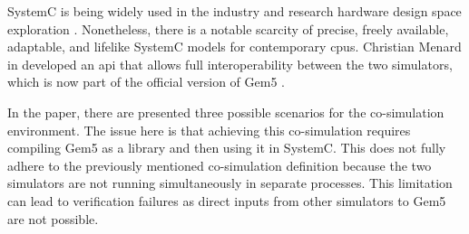 SystemC is being widely used in the industry and research hardware design space exploration \cite{menard2017system}. Nonetheless, there 
is a notable scarcity of precise, freely available, adaptable, and lifelike SystemC models for contemporary \glspl{cpu}. Christian Menard 
in \cite{menard2017system} developed an \gls{api} that allows full interoperability between the two simulators, which is now part of the 
official version of Gem5 \cite{Thegem5simulatorV2}. 

In the paper, there are presented three possible scenarios for the co-simulation environment. The issue here is that achieving 
this co-simulation requires compiling Gem5 as a library and then using it in SystemC. This does not fully adhere to the previously mentioned 
co-simulation definition because the two simulators are not running simultaneously in separate processes. This limitation can lead to 
verification failures as direct inputs from other simulators to Gem5 are not possible.

